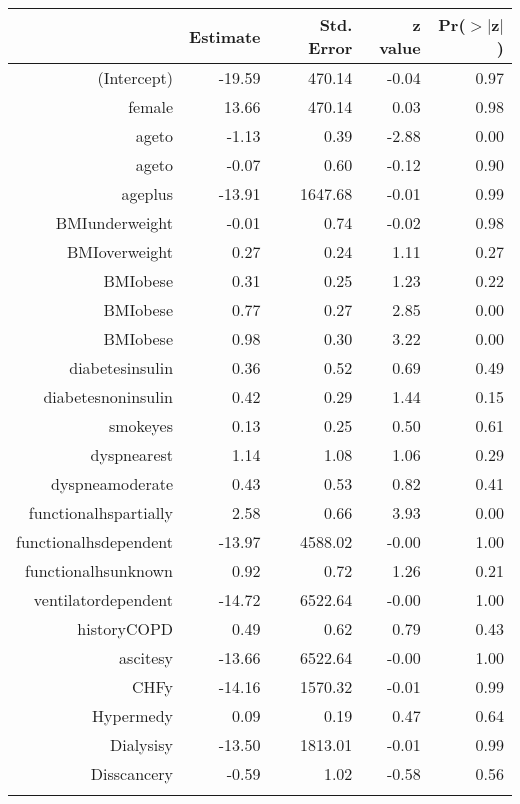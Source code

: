 
\bigskip\bigskip
\centering
\begin{tabular}{rrrrr}
  \hline
 & Estimate & Std. Error & z value & Pr($>$$|$z$|$) \\ 
  \hline
(Intercept) & -19.59 & 470.14 & -0.04 & 0.97 \\ 
  female & 13.66 & 470.14 & 0.03 & 0.98 \\ 
  age\-65\-to\-74 & -1.13 & 0.39 & -2.88 & 0.00 \\ 
  age\-75\-to\-84 & -0.07 & 0.60 & -0.12 & 0.90 \\ 
  age\-85\-plus & -13.91 & 1647.68 & -0.01 & 0.99 \\ 
  BMI\-underweight & -0.01 & 0.74 & -0.02 & 0.98 \\ 
  BMI\-overweight & 0.27 & 0.24 & 1.11 & 0.27 \\ 
  BMI\-obese\-1 & 0.31 & 0.25 & 1.23 & 0.22 \\ 
  BMI\-obese\-2 & 0.77 & 0.27 & 2.85 & 0.00 \\ 
  BMI\-obese\-3 & 0.98 & 0.30 & 3.22 & 0.00 \\ 
  diabetes\-insulin & 0.36 & 0.52 & 0.69 & 0.49 \\ 
  diabetes\-noninsulin & 0.42 & 0.29 & 1.44 & 0.15 \\ 
  smoke\-yes & 0.13 & 0.25 & 0.50 & 0.61 \\ 
  dyspnea\-rest & 1.14 & 1.08 & 1.06 & 0.29 \\ 
  dyspnea\-moderate & 0.43 & 0.53 & 0.82 & 0.41 \\ 
  functional\-hs\-partially & 2.58 & 0.66 & 3.93 & 0.00 \\ 
  functional\-hs\-dependent & -13.97 & 4588.02 & -0.00 & 1.00 \\ 
  functional\-hs\-unknown & 0.92 & 0.72 & 1.26 & 0.21 \\ 
  ventilator\-dependent & -14.72 & 6522.64 & -0.00 & 1.00 \\ 
  history\-COPD & 0.49 & 0.62 & 0.79 & 0.43 \\ 
  ascites\-y & -13.66 & 6522.64 & -0.00 & 1.00 \\ 
  CHF\-y & -14.16 & 1570.32 & -0.01 & 0.99 \\ 
  Hyper\-med\-y & 0.09 & 0.19 & 0.47 & 0.64 \\ 
  Dialysis\-y & -13.50 & 1813.01 & -0.01 & 0.99 \\ 
  Diss\-cancer\-y & -0.59 & 1.02 & -0.58 & 0.56 \\ 
$$
\end{tabular}
